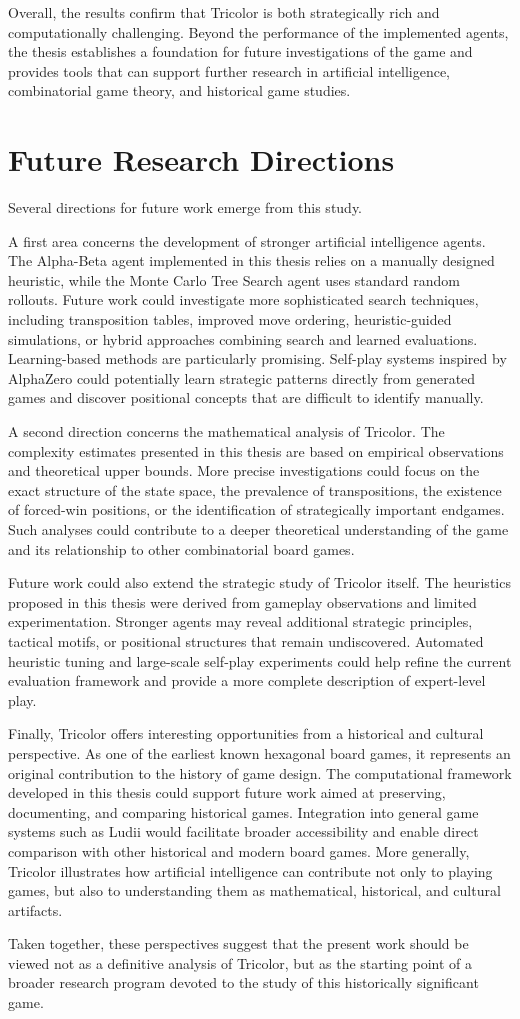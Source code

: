Overall, the results confirm that Tricolor is both strategically rich and computationally challenging. Beyond the performance of the implemented agents, the thesis establishes a foundation for future investigations of the game and provides tools that can support further research in artificial intelligence, combinatorial game theory, and historical game studies.

\section{Future Research Directions}

Several directions for future work emerge from this study.

A first area concerns the development of stronger artificial intelligence agents. The Alpha-Beta agent implemented in this thesis relies on a manually designed heuristic, while the Monte Carlo Tree Search agent uses standard random rollouts. Future work could investigate more sophisticated search techniques, including transposition tables, improved move ordering, heuristic-guided simulations, or hybrid approaches combining search and learned evaluations. Learning-based methods are particularly promising. Self-play systems inspired by AlphaZero could potentially learn strategic patterns directly from generated games and discover positional concepts that are difficult to identify manually.

A second direction concerns the mathematical analysis of Tricolor. The complexity estimates presented in this thesis are based on empirical observations and theoretical upper bounds. More precise investigations could focus on the exact structure of the state space, the prevalence of transpositions, the existence of forced-win positions, or the identification of strategically important endgames. Such analyses could contribute to a deeper theoretical understanding of the game and its relationship to other combinatorial board games.

Future work could also extend the strategic study of Tricolor itself. The heuristics proposed in this thesis were derived from gameplay observations and limited experimentation. Stronger agents may reveal additional strategic principles, tactical motifs, or positional structures that remain undiscovered. Automated heuristic tuning and large-scale self-play experiments could help refine the current evaluation framework and provide a more complete description of expert-level play.

Finally, Tricolor offers interesting opportunities from a historical and cultural perspective. As one of the earliest known hexagonal board games, it represents an original contribution to the history of game design. The computational framework developed in this thesis could support future work aimed at preserving, documenting, and comparing historical games. Integration into general game systems such as Ludii would facilitate broader accessibility and enable direct comparison with other historical and modern board games. More generally, Tricolor illustrates how artificial intelligence can contribute not only to playing games, but also to understanding them as mathematical, historical, and cultural artifacts.

Taken together, these perspectives suggest that the present work should be viewed not as a definitive analysis of Tricolor, but as the starting point of a broader research program devoted to the study of this historically significant game.